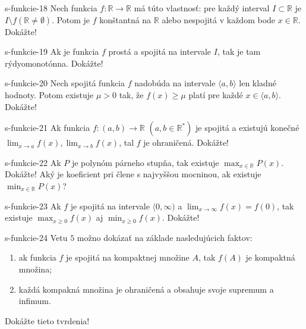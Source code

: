 	\begin{defproblem}{s-funkcie-18}
	Nech funkcia $f: \mathbb{R} \rightarrow \mathbb{R}$ má túto vlastnosť: pre každý interval $I \subset \mathbb{R}$ je $I \setminus f(\mathbb{R} \neq \emptyset)$. Potom je $f$ konštantná na $\mathbb{R}$ alebo nespojitá v každom bode $x \in \mathbb{R}$. Dokážte!
	\end{defproblem}
	
	\begin{defproblem}{s-funkcie-19}
	Ak je funkcia $f$ prostá a spojitá na intervale $I$, tak je tam rýdyomonotónna. Dokážte!
	\end{defproblem}
	
	\begin{defproblem}{s-funkcie-20}
	Nech spojitá funkcia $f$ nadobúda na intervale $\langle a,b \rangle$ len kladné hodnoty. Potom existuje $\mu > 0$ tak, že $f(x) \geq \mu$ platí pre každé $x \in \langle a,b \rangle$. Dokážte!
	\end{defproblem}
	
	\begin{defproblem}{s-funkcie-21}
	Ak funkcia $f: (a,b) \rightarrow \mathbb{R}$ $(a,b\in \mathbb{R^*})$ je spojitá a existujú konečné $\lim_{x \rightarrow a}f(x),\lim_{x \rightarrow b}f(x)$, tal $f$ je ohraničená. Dokážte!
	\end{defproblem}
	
	\begin{defproblem}{s-funkcie-22}
	Ak $P$ je polynóm párneho stupňa, tak existuje $\max_{x \in \mathbb{R}} P(x)$. Dokážte! Aký je koeficient pri člene s najvyššou mocninou, ak existuje $\min_{x \in \mathbb{R}} P(x)$?
	\end{defproblem}
	
	\begin{defproblem}{s-funkcie-23}
	Ak $f$ je spojitá na intervale $\langle0,\infty)$ a $\lim_{x \rightarrow \infty} f(x)=f(0)$, tak existuje $\max_{x \geq 0} f(x)$ aj $\min_{x \geq 0}f(x)$. Dokážte!
	\end{defproblem}
	
	\begin{defproblem}{s-funkcie-24}
	Vetu $5$ možno dokázať na základe nasledujúcich faktov:
	\begin{enumerate}
	\item ak funkcia $f$ je spojitá na kompaktnej množine $A$, tak $f(A)$ je kompaktná množina;
	\item každá kompakná množina je ohraničená a obsahuje svoje supremum a infimum.
	\end{enumerate}
	Dokážte tieto tvrdenia!
	\end{defproblem}
	
